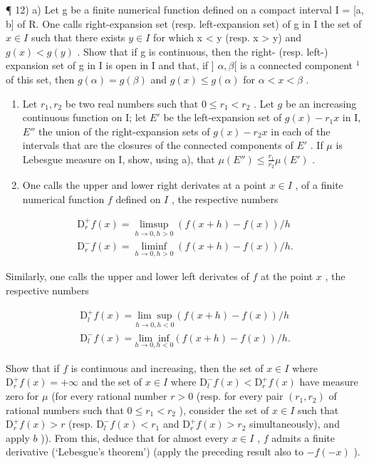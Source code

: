 ¶ 12) a) Let g be a finite numerical function defined on a compact interval I = {[}a, b{]} of R. One calls right-expansion set (resp. left-expansion set) of g in I the set of \(x \in I\) such that there exists \(y \in I\) for which x < y (resp. x \textgreater{} y) and \(g(x) < g(y)\) . Show that if g is continuous, then the right- (resp. left-) expansion set of g in I is open in I and that, if {]} \(\alpha, \beta[\) is a connected component \(^{1}\) of this set, then \(g(\alpha) = g(\beta)\) and \(g(x) \leqslant g(\alpha)\) for \(\alpha < x < \beta\) .

\begin{enumerate}
\def\labelenumi{\alph{enumi})}
\setcounter{enumi}{1}
\item
  Let \(r_1, r_2\) be two real numbers such that \(0 \leqslant r_1 < r_2\) . Let \(g\) be an increasing continuous function on I; let \(E'\) be the left-expansion set of \(g(x) - r_1x\) in I, \(E''\) the union of the right-expansion sets of \(g(x) - r_2x\) in each of the intervals that are the closures of the connected components of \(E'\) . If \(\mu\) is Lebesgue measure on I, show, using a), that \(\mu(E'') \leqslant \frac{r_1}{r_2} \mu(E')\) .
\item
  One calls the upper and lower right derivates at a point \(x \in I\) , of a finite numerical function \(f\) defined on \(I\) , the respective numbers
\end{enumerate}

\[
\begin{array}{l} \mathrm{D} _ {r} ^ {+} f (x) = \operatorname * {l i m s u p} _ {h \to 0,   h > 0} \left(f (x + h) - f (x)\right) / h \\ \mathrm{D} _ {r} ^ {-} f (x) = \operatorname * {l i m i n f} _ {h \to 0,   h > 0} \left(f (x + h) - f (x)\right) / h. \end{array}
\]

Similarly, one calls the upper and lower left derivates of \(f\) at the point \(x\) , the respective numbers

\[
\begin{array}{l}\mathrm{D} _ {l} ^ {+} f (x) = \underset {h \rightarrow 0, h <   0} {\lim \sup} \left(f (x + h) - f (x)\right) / h\\\mathrm{D} _ {l} ^ {-} f (x) = \underset {h \rightarrow 0, h <   0} {\lim \inf} \left(f (x + h) - f (x)\right) / h.\end{array}
\]

Show that if \(f\) is continuous and increasing, then the set of \(x \in I\) where \(\mathrm{D}_r^+ f(x) = +\infty\) and the set of \(x \in I\) where \(\mathrm{D}_l^- f(x) < \mathrm{D}_r^+ f(x)\) have measure zero for \(\mu\) (for every rational number \(r > 0\) (resp. for every pair \((r_1, r_2)\) of rational numbers such that \(0 \leqslant r_1 < r_2\) ), consider the set of \(x \in I\) such that \(\mathrm{D}_r^+ f(x) > r\) (resp. \(\mathrm{D}_l^- f(x) < r_1\) and \(\mathrm{D}_r^+ f(x) > r_2\) simultaneously), and apply \(b\) )). From this, deduce that for almost every \(x \in I\) , \(f\) admits a finite derivative (`Lebesgue's theorem') (apply the preceding result also to \(-f(-x)\) ).

